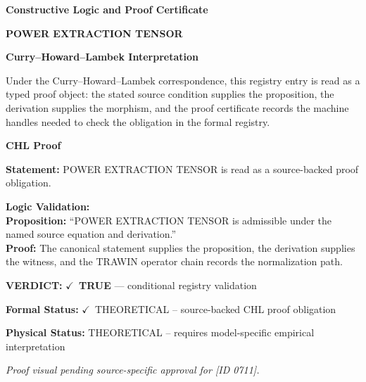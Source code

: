 \clearpage
\begingroup\tzpsupportsetup
\noindent\textbf{\fontsize{10.8pt}{12.8pt}\selectfont [ID 0711] Constructive Logic and Proof Certificate}\par
\noindent\textbf{\fontsize{10pt}{12pt}\selectfont POWER EXTRACTION TENSOR}\par
\vspace{0.45em}
\begingroup
\footnotesize
\setlength{\parskip}{0.22em}
\setlength{\parindent}{0pt}
\noindent\textbf{Curry--Howard--Lambek Interpretation}\par
Under the Curry--Howard--Lambek correspondence, this registry entry is read as a typed proof
object: the stated source condition supplies the proposition, the derivation supplies the
morphism, and the proof certificate records the machine handles needed to check the obligation
in the formal registry.

\vspace{0.45em}
\noindent\textbf{CHL Proof}\par
\textbf{Statement:} POWER EXTRACTION TENSOR is read as a source-backed proof obligation.

\textbf{Logic Validation:}\\
\textbf{Proposition:} ``POWER EXTRACTION TENSOR is admissible under the named source equation and derivation.''\\
\textbf{Proof:} The canonical statement supplies the proposition, the derivation supplies the witness, and the TRAWIN operator chain records the normalization path.

\textbf{VERDICT:} \ensuremath{\checkmark}\ \textbf{TRUE} --- conditional registry validation

\textbf{Formal Status:} \ensuremath{\checkmark}\ THEORETICAL -- source-backed CHL proof obligation

\textbf{Physical Status:} THEORETICAL -- requires model-specific empirical interpretation
\par\vspace{0.45em}
\par
\vfill
\begingroup\footnotesize\itshape
Proof visual pending source-specific approval for [ID 0711].
\par\endgroup
\vfill
\endgroup
\endgroup

